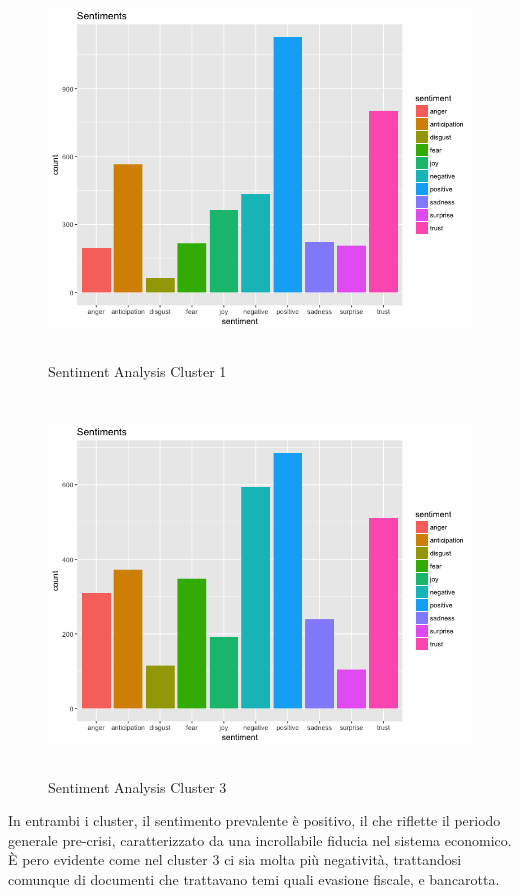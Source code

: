 \documentclass[]{article}
\begin{document}
\begin{figure}[H]
	\includegraphics[width=\linewidth, height=10cm]{../graphs/sentiment_gr1.png}
	\caption{Sentiment Analysis Cluster 1}
\end{figure}

\begin{figure}[H]
	\includegraphics[width=\linewidth, height=10cm]{../graphs/sentiment_gr3.png}
	\caption{Sentiment Analysis Cluster 3}
\end{figure}

In entrambi i cluster, il sentimento prevalente è positivo, il che riflette il periodo generale pre-crisi, caratterizzato da una incrollabile fiducia nel sistema economico.
\newline
È pero evidente come nel cluster 3 ci sia molta più negatività, trattandosi comunque di documenti che trattavano temi quali evasione fiscale, e bancarotta. 
\end{document}
